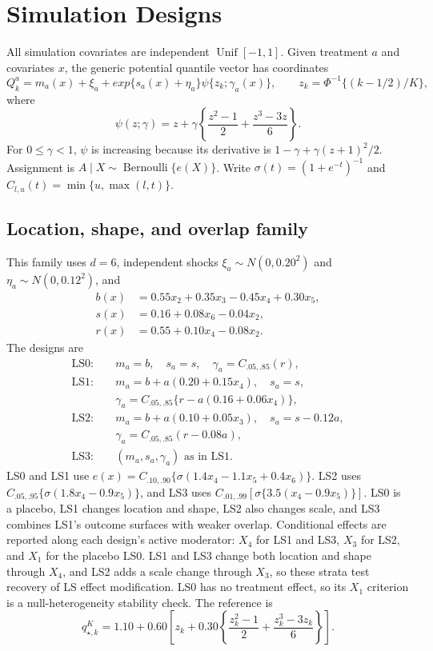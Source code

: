\section{Simulation Designs}\label{app:dgps}

All simulation covariates are independent $\operatorname{Unif}[-1,1]$. Given treatment $a$ and covariates $x$, the generic potential quantile vector has coordinates
\begin{equation}
 Q_k^a=m_a(x)+\xi_a+exp\{s_a(x)+\eta_a\}\psi\{z_k;\gamma_a(x)\},
 \qquad z_k=\Phi^{-1}\{(k-1/2)/K\},\label{eq:dgp-app}
\end{equation}
where
\[
 \psi(z;\gamma)=z+\gamma\left\{\frac{z^2-1}{2}+\frac{z^3-3z}{6}\right\}.
\]
For $0\leq\gamma<1$, $\psi$ is increasing because its derivative is $1-\gamma+\gamma(z+1)^2/2$. Assignment is $A\mid X\sim\operatorname{Bernoulli}\{e(X)\}$. Write $\sigma(t)=(1+e^{-t})^{-1}$ and $C_{l,u}(t)=\min\{u,\max(l,t)\}$.

\subsection{Location, shape, and overlap family}

This family uses $d=6$, independent shocks $\xi_a\sim N(0,0.20^2)$ and $\eta_a\sim N(0,0.12^2)$, and
\begin{align*}
 b(x)&=0.55x_2+0.35x_3-0.45x_4+0.30x_5,\\
 s(x)&=0.16+0.08x_6-0.04x_2,\\
 r(x)&=0.55+0.10x_4-0.08x_2.
\end{align*}
The designs are
\begin{align*}
\mathrm{LS0}:\quad&m_a=b,\quad s_a=s,\quad \gamma_a=C_{.05,.85}(r),\\
\mathrm{LS1}:\quad&m_a=b+a(0.20+0.15x_4),\quad s_a=s,\\
&\gamma_a=C_{.05,.85}\{r-a(0.16+0.06x_4)\},\\
\mathrm{LS2}:\quad&m_a=b+a(0.10+0.05x_3),\quad s_a=s-0.12a,\\
&\gamma_a=C_{.05,.85}(r-0.08a),\\
\mathrm{LS3}:\quad&(m_a,s_a,\gamma_a)\text{ as in LS1}.
\end{align*}
LS0 and LS1 use $e(x)=C_{.10,.90}\{\sigma(1.4x_4-1.1x_5+0.4x_6)\}$. LS2 uses $C_{.05,.95}\{\sigma(1.8x_4-0.9x_5)\}$, and LS3 uses $C_{.01,.99}[\sigma\{3.5(x_4-0.9x_5)\}]$. LS0 is a placebo, LS1 changes location and shape, LS2 also changes scale, and LS3 combines LS1's outcome surfaces with weaker overlap. Conditional effects are reported along each design's active moderator: $X_4$ for LS1 and LS3, $X_3$ for LS2, and $X_1$ for the placebo LS0. LS1 and LS3 change both location and shape through $X_4$, and LS2 adds a scale change through $X_3$, so these strata test recovery of LS effect modification. LS0 has no treatment effect, so its $X_1$ criterion is a null-heterogeneity stability check. The reference is
\[
 q_{\star,k}^K=1.10+0.60\left[z_k+0.30
 \left\{\frac{z_k^2-1}{2}+\frac{z_k^3-3z_k}{6}\right\}\right].
\]

